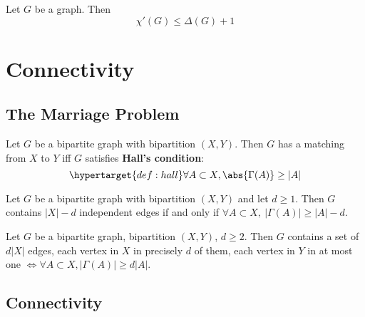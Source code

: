 \documentclass{article}
\begin{document}
\begin{nthm}\label{thm:30}
    Let $G$ be a graph. Then
    \begin{equation*}
        \chi'(G) \leq \Delta(G) + 1
    \end{equation*}
\end{nthm}

\clearpage
\section{Connectivity}
\subsection{The Marriage Problem}















\begin{nthm}\label{thm:31}
    Let $G$ be a bipartite graph with bipartition $(X,Y)$.
    Then $G$ has a matching from $X$ to $Y$ iff $G$ satisfies \textbf{Hall's condition}:
    \begin{equation*}
        \hypertarget{def:hall}\forall A \subset X, \abs{\Gamma(A)} \geq |A|
    \end{equation*}
\end{nthm}






\begin{ncor}\label{cor:32}
    Let $G$ be a bipartite graph with bipartition $(X,Y)$ and let $d \geq 1$.
    Then $G$ contains $|X|-d$ independent edges if and only if $\forall A \subset X, \ |\Gamma(A)| \geq |A| - d$.
\end{ncor}

\begin{ncor}\label{cor:33}
    Let $G$ be a bipartite graph, bipartition $(X,Y)$, $d \geq 2$.
    Then $G$ contains a set of $d |X|$ edges, each vertex in $X$ in precisely $d$ of them, each vertex in $Y$ in at most one $\iff \forall A \subset X, |\Gamma(A)| \geq d |A|$.
\end{ncor}



\subsection{Connectivity}
\end{document}
